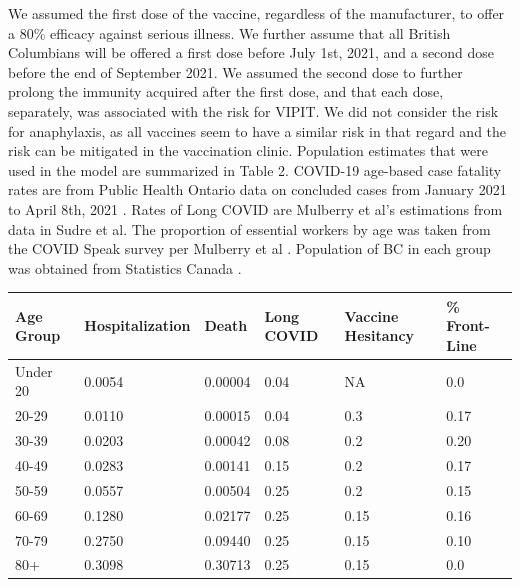 \documentclass[]{interact}
\theoremstyle{plain}%
\theoremstyle{definition}
\theoremstyle{remark}
\begin{document}
We assumed the first dose of the vaccine, regardless of the
manufacturer, to offer a 80\% efficacy against serious illness. We
further assume that all British Columbians will be offered a first dose
before July 1st, 2021, and a second dose before the end of September
2021. We assumed the second dose to further prolong the immunity
acquired after the first dose, and that each dose, separately, was
associated with the risk for VIPIT. We did not consider the risk for
anaphylaxis, as all vaccines seem to have a similar risk in that regard
and the risk can be mitigated in the vaccination clinic. Population
estimates that were used in the model are summarized in Table 2.
COVID-19 age-based case fatality rates are from Public Health Ontario
data on concluded cases from January 2021 to April 8th, 2021
\citep{public_health_ontario_all_2021}. Rates of Long COVID are Mulberry
et al's estimations from data in Sudre et
al\citep{sudre_attributes_2021}. The proportion of essential workers by
age was taken from the COVID Speak survey per Mulberry et al
\citep{mulberry_vaccine_2021}. Population of BC in each group was
obtained from Statistics Canada \citep{statistics_canada_census_2017}.

\begin{table}
{\begin{tabular}{llllll} \toprule
Age  Group & Hospitalization & Death   & Long COVID & Vaccine Hesitancy & \% Front-Line \\ \hline
Under 20   & 0.0054          & 0.00004 & 0.04       & NA                & 0.0           \\ 
20-29      & 0.0110          & 0.00015 & 0.04       & 0.3               & 0.17          \\ 
30-39      & 0.0203          & 0.00042 & 0.08       & 0.2               & 0.20          \\ 
40-49      & 0.0283          & 0.00141 & 0.15       & 0.2               & 0.17          \\ 
50-59      & 0.0557          & 0.00504 & 0.25       & 0.2               & 0.15          \\ 
60-69      & 0.1280          & 0.02177 & 0.25       & 0.15              & 0.16          \\ 
70-79      & 0.2750          & 0.09440 & 0.25       & 0.15              & 0.10          \\ 
80+        & 0.3098          & 0.30713 & 0.25       & 0.15              & 0.0           \\ \bottomrule
\end{tabular}}
\label{model-param}
\end{table}
\end{document}
